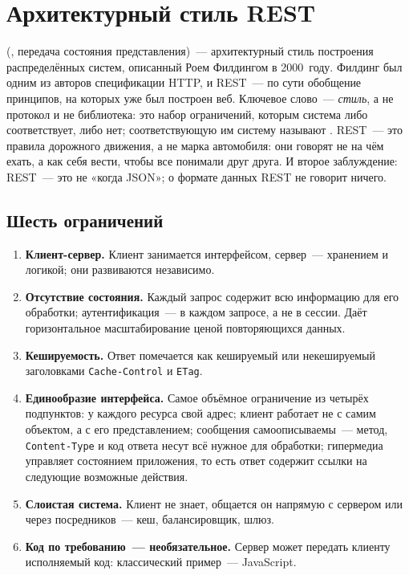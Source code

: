\section{Архитектурный стиль REST}

 (, передача состояния
представления)~--- архитектурный стиль построения распределённых систем,
описанный Роем Филдингом в 2000~году. Филдинг был одним из авторов спецификации
HTTP, и REST~--- по сути обобщение принципов, на которых уже был построен веб.
Ключевое слово~--- \emph{стиль}, а не протокол и не библиотека: это набор
ограничений, которым система либо соответствует, либо нет; соответствующую им
систему называют . REST~--- это правила дорожного движения, а не
марка автомобиля: они говорят не на чём ехать, а как себя вести, чтобы все
понимали друг друга. И второе заблуждение: REST~--- это не «когда JSON»; о
формате данных REST не говорит ничего.

\subsection{Шесть ограничений}

\begin{enumerate}
\item \textbf{Клиент-сервер.} Клиент занимается интерфейсом, сервер~---
      хранением и логикой; они развиваются независимо.
\item \textbf{Отсутствие состояния.} Каждый запрос содержит всю информацию для
      его обработки; аутентификация~--- в каждом запросе, а не в сессии. Даёт
      горизонтальное масштабирование ценой повторяющихся данных.
\item \textbf{Кешируемость.} Ответ помечается как кешируемый или некешируемый
      заголовками \texttt{Cache-Control} и \texttt{ETag}.
\item \textbf{Единообразие интерфейса.} Самое объёмное ограничение из четырёх
      подпунктов: у каждого ресурса свой адрес; клиент работает не с самим
      объектом, а с его представлением; сообщения самоописываемы~--- метод,
      \texttt{Content-Type} и код ответа несут всё нужное для обработки;
      гипермедиа управляет состоянием приложения, то есть ответ содержит ссылки
      на следующие возможные действия.
\item \textbf{Слоистая система.} Клиент не знает, общается он напрямую с
      сервером или через посредников~--- кеш, балансировщик, шлюз.
\item \textbf{Код по требованию~--- необязательное.} Сервер может передать
      клиенту исполняемый код: классический пример~--- JavaScript.
\end{enumerate}

